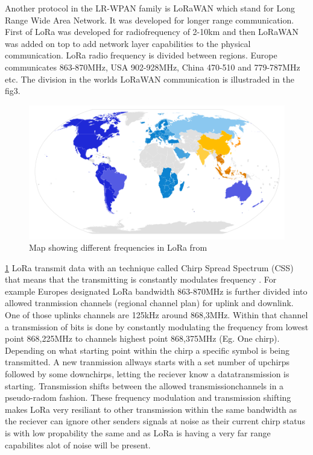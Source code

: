\documentclass[article,a4paper]{IEEEtran}
\begin{document}
    \newline\newline
    Another protocol in the LR-WPAN family is LoRaWAN which stand for Long Range Wide Area Network. It was developed for longer range communication. First of LoRa was developed for radiofrequency of 2-10km and then LoRaWAN was added on top to add network layer capabilities to the physical communication. LoRa radio frequency is divided between regions. Europe communicates 863-870MHz, USA 902-928MHz, China 470-510 and 779-787MHz etc. The division in the worlds LoRaWAN communication is illustraded in the fig3.
    \begin{figure}
        \includegraphics[width=\columnwidth]{LoRaWANdivide.png} 
        \caption{Map showing different frequencies in LoRa from \cite{LoRaWanfreqCountry}}
        \label{fig3:freq LoRaWAN}   
    \end{figure}
    \ref{fig3:freq LoRaWAN}
    LoRa transmit data with an technique called Chirp Spread Spectrum (CSS) that means that the transmitting is constantly modulates frequency \cite{LoraWanSpecOverview,LoRaTutorial}. For example Europes designated LoRa bandwidth 863-870MHz is further divided into allowed tranmission channels (regional channel plan) for uplink and downlink. One of those uplinks channels are 125kHz around 868,3MHz. Within that channel a transmission of bits is done by constantly modulating the frequency from lowest point 868,225MHz to channels highest point 868,375MHz (Eg. One chirp). Depending on what starting point within the chirp a specific symbol is being transmitted. A new tranmission allways starts with a set number of upchirps followed by some downchirps, letting the reciever know a datatransmission is starting. Transmission shifts between the allowed transmissionchannels in a pseudo-radom fashion. These frequency modulation and transmission shifting makes LoRa very resiliant to other transmission within the same bandwidth as the reciever can ignore other senders signals at noise as their current chirp status is with low propability the same and as LoRa is having a very far range capabilites alot of noise will be present.      
\end{document}
